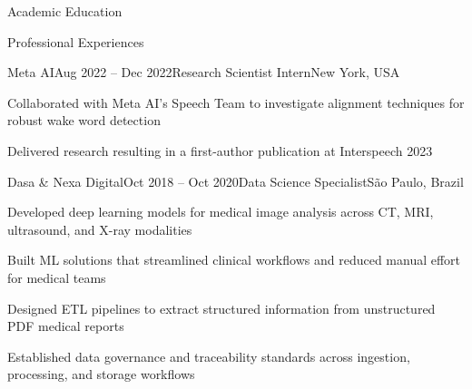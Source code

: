 \documentclass{config/resume} %
\begin{document}
\begin{rSection}{Academic Education}
\begin{rSection}{Professional Experiences}
\begin{rSubsection}{Meta AI}{Aug 2022 -- Dec 2022}{Research Scientist Intern}{New York, USA}
\item Collaborated with Meta AI's Speech Team to investigate alignment techniques for robust wake word detection
\item Delivered research resulting in a first-author publication at Interspeech 2023

\end{rSubsection}

\begin{rSubsection}{Dasa \& Nexa Digital}{Oct 2018 -- Oct 2020}{Data Science Specialist}{São Paulo, Brazil}

\item Developed deep learning models for medical image analysis across CT, MRI, ultrasound, and X-ray modalities
\item Built ML solutions that streamlined clinical workflows and reduced manual effort for medical teams
\item Designed ETL pipelines to extract structured information from unstructured PDF medical reports
\item Established data governance and traceability standards across ingestion, processing, and storage workflows

\end{rSubsection}

\end{rSection}

\end{rSection}
\end{document}

